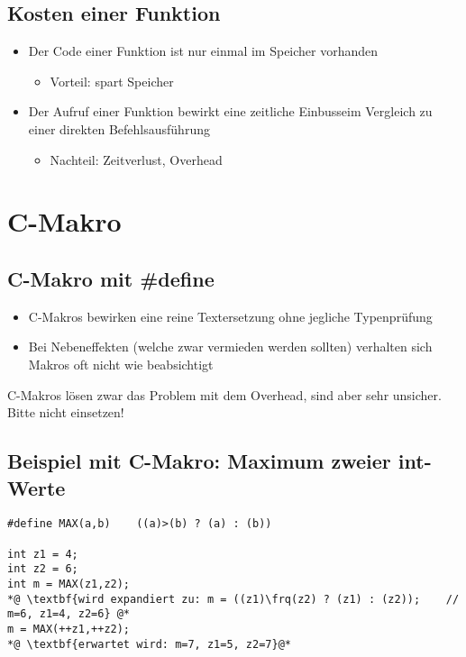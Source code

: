 \subsection{Kosten einer Funktion}
\label{sec:Kosten einer Funktion}
\begin{itemize}
	\item Der Code einer Funktion ist nur einmal im Speicher vorhanden
	\begin{itemize}
		\item Vorteil: spart Speicher
	\end{itemize}
	\item Der Aufruf einer Funktion bewirkt eine zeitliche Einbusseim Vergleich zu einer direkten Befehlsausführung
	\begin{itemize}
		\item Nachteil: Zeitverlust, Overhead
	\end{itemize}
\end{itemize}


\section{C-Makro}
\label{sec:C-Makro}

\subsection{C-Makro mit {\#define}}
\label{sec:C-Makro mit define}
\begin{itemize}
	\item C-Makros bewirken eine reine Textersetzung ohne jegliche Typenprüfung
	\item Bei Nebeneffekten (welche zwar vermieden werden sollten) verhalten sich Makros oft nicht wie beabsichtigt
\end{itemize}
\begin{achtung}	%
C-Makros lösen zwar das Problem mit dem Overhead, sind aber sehr unsicher. Bitte nicht einsetzen!
\end{achtung}


\subsection{Beispiel mit C-Makro: Maximum zweier int-Werte}
\label{sec:Beispiel mit C-Makro: Maximum zweier int-Werte}
\noindent
\begin{minipage}{\linewidth}
\begin{lstlisting}
#define MAX(a,b)	((a)>(b) ? (a) : (b))

int z1 = 4;
int z2 = 6;
int m = MAX(z1,z2);
*@ \textbf{wird expandiert zu: m = ((z1)\frq(z2) ? (z1) : (z2));	// m=6, z1=4, z2=6} @*
m = MAX(++z1,++z2);
*@ \textbf{erwartet wird: m=7, z1=5, z2=7}@*
\end{lstlisting}
\end{minipage}


